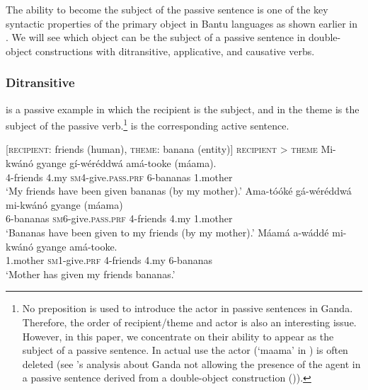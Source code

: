 \documentclass[output=paper,
            colorlinks, citecolor=brown
            ,draftmode
		  ]{langscibook}
\begin{document}
    The ability to become the subject of the passive sentence is one of the key syntactic properties of the primary object in Bantu languages as shown earlier in . We will see which object can be the subject of a passive sentence in double-object constructions with ditransitive, applicative, and causative verbs.



\subsubsection{Ditransitive}
\label{sec:yoneda:3.2.1}


 is a passive example in which the recipient is the subject, and in  the theme is the subject of the passive verb.\footnote{No preposition is used to introduce the actor in passive sentences in Ganda. Therefore, the order of recipient\slash theme and actor is also an interesting issue. However, in this paper, we concentrate on their ability to appear as the subject of a passive sentence. In actual use the actor (‘maama’ in ) is often deleted (see \citeauthor{Ssekiryango2006}'s analysis about Ganda not allowing the presence of the agent in a passive sentence derived from a double-object construction (\citeyear[72]{Ssekiryango2006})).}  is the corresponding active sentence.  

\newpage
\ea%
    \label{ex:yoneda:19}
    [\textsc{recipient}: friends (human), \textsc{theme}: banana (entity)]  \textsc{recipient} > \textsc{theme}
    \ea\label{ex:yoneda:19a}\gll Mi-kwánó  gyange   gí-wéréddwá         amá-tooke   (máama).\\
         4-friends    4.my    \textsc{sm4}-give.\textsc{pass.prf}  6-bananas    1.mother\\
    \glt `My friends have been given bananas (by my mother).'
    \ex\label{ex:yoneda:19b}\gll  Ama-tóóké   gá-wéréddwá           mi-kwánó    gyange   (máama)\\
    6-bananas    \textsc{sm6}-give.\textsc{pass.prf}    4-friends      4.my    1.mother\\
    \glt ‘Bananas have been given to my friends (by my mother).’
    \ex\label{ex:yoneda:19c} \gll Máamá     a-wáddé       mi-kwánó    gyange   amá-tooke.\\
    1.mother    \textsc{sm1}-give.\textsc{prf}  4-friends      4.my    6-bananas\\
    \glt ‘Mother has given my friends bananas.’
    \z
\z
\end{document}
